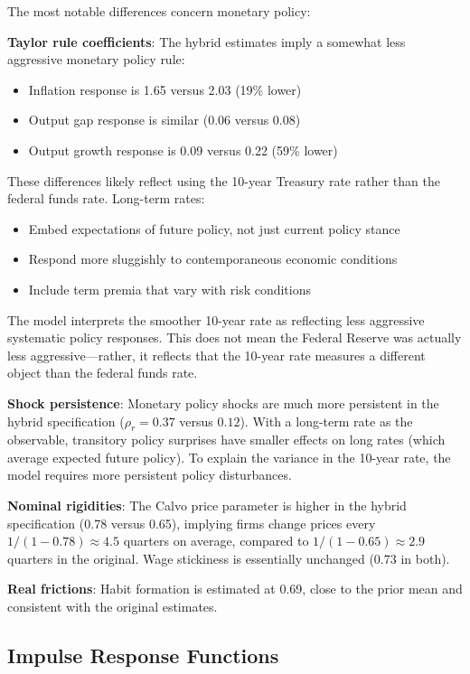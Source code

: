 \documentclass[12pt]{article}
\begin{document}
The most notable differences concern monetary policy:

\textbf{Taylor rule coefficients}: The hybrid estimates imply a somewhat less aggressive monetary policy rule:
\begin{itemize}
    \item Inflation response is 1.65 versus 2.03 (19\% lower)
    \item Output gap response is similar (0.06 versus 0.08)
    \item Output growth response is 0.09 versus 0.22 (59\% lower)
\end{itemize}

These differences likely reflect using the 10-year Treasury rate rather than the federal funds rate. Long-term rates:
\begin{itemize}
    \item Embed expectations of future policy, not just current policy stance
    \item Respond more sluggishly to contemporaneous economic conditions
    \item Include term premia that vary with risk conditions
\end{itemize}

The model interprets the smoother 10-year rate as reflecting less aggressive systematic policy responses. This does not mean the Federal Reserve was actually less aggressive---rather, it reflects that the 10-year rate measures a different object than the federal funds rate.

\textbf{Shock persistence}: Monetary policy shocks are much more persistent in the hybrid specification ($\rho_r = 0.37$ versus $0.12$). With a long-term rate as the observable, transitory policy surprises have smaller effects on long rates (which average expected future policy). To explain the variance in the 10-year rate, the model requires more persistent policy disturbances.

\textbf{Nominal rigidities}: The Calvo price parameter is higher in the hybrid specification (0.78 versus 0.65), implying firms change prices every $1/(1-0.78) \approx 4.5$ quarters on average, compared to $1/(1-0.65) \approx 2.9$ quarters in the original. Wage stickiness is essentially unchanged (0.73 in both).

\textbf{Real frictions}: Habit formation is estimated at 0.69, close to the prior mean and consistent with the original estimates. 

\subsection{Impulse Response Functions}
\end{document}
